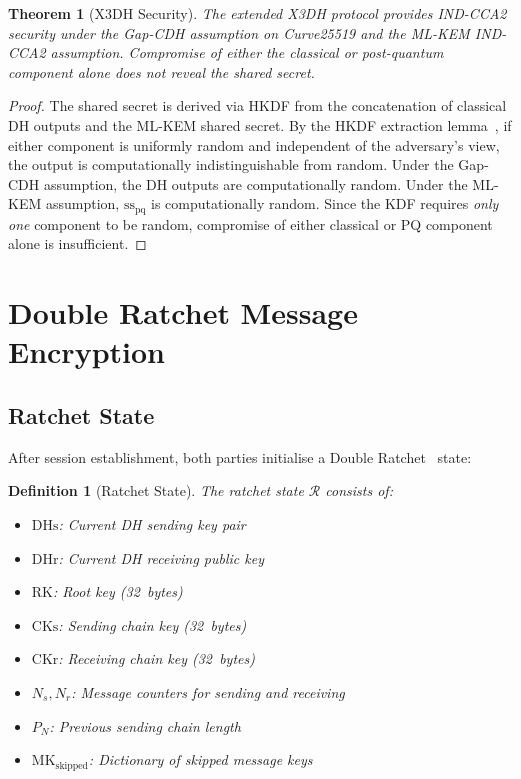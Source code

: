 \documentclass[11pt,a4paper]{article}
\newtheorem{definition}{Definition}[section]
\newtheorem{theorem}{Theorem}[section]
\begin{document}
\begin{theorem}[X3DH Security]
    \label{thm:x3dh}
    The extended X3DH protocol provides IND-CCA2 security under the
    Gap-CDH assumption on Curve25519 and the ML-KEM IND-CCA2 assumption.
    Compromise of either the classical or post-quantum component alone does
    not reveal the shared secret.
\end{theorem}

\begin{proof}
    The shared secret is derived via HKDF from the concatenation of
    classical DH outputs and the ML-KEM shared secret.  By the
    HKDF extraction lemma~\cite{krawczyk2010hkdf}, if either component is
    uniformly random and independent of the adversary's view, the output
    is computationally indistinguishable from random.  Under the Gap-CDH
    assumption, the DH outputs are computationally random.  Under the
    ML-KEM assumption, $\mathrm{ss}_{\mathrm{pq}}$ is computationally
    random.  Since the KDF requires \emph{only one} component to be
    random, compromise of either classical or PQ component alone is
    insufficient.
\end{proof}

\section{Double Ratchet Message Encryption}
\label{sec:ratchet}

\subsection{Ratchet State}

After session establishment, both parties initialise a Double
Ratchet~\cite{marlinspike2016signal} state:

\begin{definition}[Ratchet State]
    The ratchet state $\mathcal{R}$ consists of:
    \begin{itemize}
        \item $\mathrm{DHs}$: Current DH sending key pair
        \item $\mathrm{DHr}$: Current DH receiving public key
        \item $\mathrm{RK}$: Root key (32~bytes)
        \item $\mathrm{CKs}$: Sending chain key (32~bytes)
        \item $\mathrm{CKr}$: Receiving chain key (32~bytes)
        \item $N_s, N_r$: Message counters for sending and receiving
        \item $P_N$: Previous sending chain length
        \item $\mathrm{MK}_{\mathrm{skipped}}$: Dictionary of skipped
        message keys
    \end{itemize}
\end{definition}
\end{document}
